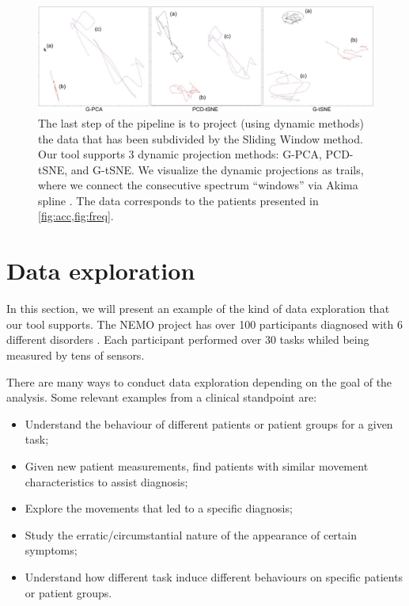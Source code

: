 \begin{figure}[ht]
\centering
\includegraphics[width=\linewidth]{figures/nemo/nemo1-projections.pdf}
\caption{The last step of the pipeline is to project (using dynamic methods) the data that has been subdivided by the Sliding Window method. Our tool supports 3 dynamic projection methods: G-PCA, PCD-tSNE, and  G-tSNE. We visualize the dynamic projections as trails, where we connect the consecutive spectrum ``windows'' via Akima spline . The data corresponds to the patients presented in \cref{fig:acc,fig:freq}.}
\label{fig:nemo1-projections}
\end{figure}

\section{Data exploration}

In this section, we will present an example of the kind of data exploration that our tool supports. The NEMO project has over 100 participants diagnosed with 6 different disorders . Each participant performed over 30 tasks whiled being measured by tens of sensors.

There are many ways to conduct data exploration depending on the goal of the analysis. Some relevant examples from a clinical standpoint are:
\begin{itemize}
    \item Understand the behaviour of different patients or patient groups for a given task; 
    \item Given new patient measurements, find patients with similar movement characteristics to assist diagnosis;
    \item Explore the movements that led to a specific diagnosis;
    \item Study the erratic/circumstantial nature of the appearance of certain symptoms;
    \item Understand how different task induce different behaviours on specific patients or patient groups. 
\end{itemize}

